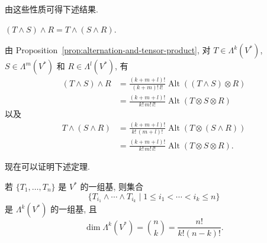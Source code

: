由这些性质可得下述结果.

\begin{RiemannProposition}\label{prop:associativity-of-wedge-product}
$(T\wedge S)\wedge R=T\wedge(S\wedge R)$.
\end{RiemannProposition}

\begin{RiemannProof}
由 Proposition~\ref{prop:alternation-and-tensor-product}, 对 $T\in\Lambda^k(V^*)$, $S\in\Lambda^m(V^*)$ 和 $R\in\Lambda^l(V^*)$, 有
\begin{align*}
  (T\wedge S)\wedge R
  &=\frac{(k+m+l)!}{(k+m)!\,l!}\operatorname{Alt}((T\wedge S)\otimes R)\\
  &=\frac{(k+m+l)!}{k!\,m!\,l!}\operatorname{Alt}(T\otimes S\otimes R)
\end{align*}
以及
\begin{align*}
  T\wedge(S\wedge R)
  &=\frac{(k+m+l)!}{k!\,(m+l)!}\operatorname{Alt}(T\otimes(S\wedge R))\\
  &=\frac{(k+m+l)!}{k!\,m!\,l!}\operatorname{Alt}(T\otimes S\otimes R).
\end{align*}
\end{RiemannProof}

现在可以证明下述定理.

\begin{RiemannTheorem}\label{thm:basis-and-dimension-of-alternating-tensors}
若 $\{T_1,\ldots,T_n\}$ 是 $V^*$ 的一组基, 则集合
\[
  \{T_{i_1}\wedge\cdots\wedge T_{i_k}\mid 1\leq i_1<\cdots<i_k\leq n\}
\]
是 $\Lambda^k(V^*)$ 的一组基, 且
\[
  \dim\Lambda^k(V^*)=\binom{n}{k}=\frac{n!}{k!(n-k)!}.
\]
\end{RiemannTheorem}

